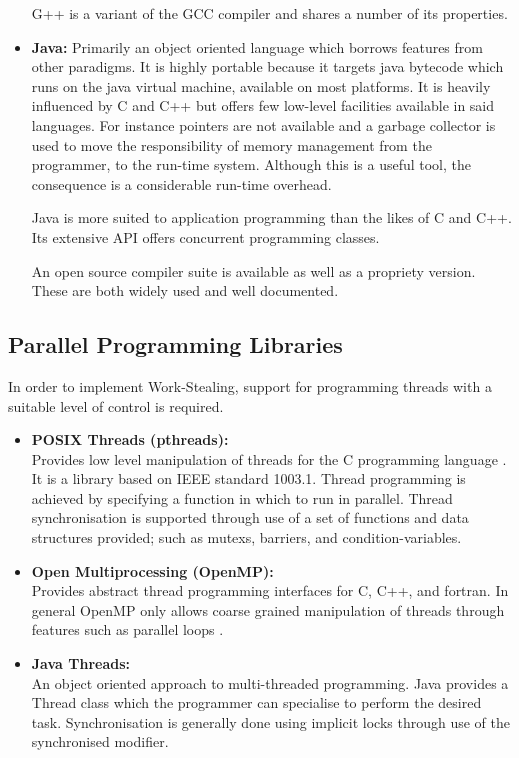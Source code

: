 \begin{itemize}
            G++ is a variant of the GCC compiler and shares a number of its properties.
            
\item \textbf{Java:}
            Primarily an object oriented language which borrows features from other paradigms.
            It is highly portable because it targets java bytecode which runs on the java virtual machine, available on most platforms.
            It is heavily influenced by C and C++ but offers few low-level facilities available in said languages. 
            For instance pointers are not available and a garbage collector is used to move
            the responsibility of memory management from the programmer, to the run-time system.
            Although this is a useful tool, the consequence is a considerable run-time overhead.
            
            Java is more suited to application programming than the likes of C and C++.
            Its extensive API offers concurrent programming classes.
            
            An open source compiler suite is available as well as a propriety version. 
            These are both widely used and well documented.
\end{itemize}

\subsection*{Parallel Programming Libraries}
In order to implement Work-Stealing, support for programming threads 
with a suitable level of control is required.

\begin{itemize}
\item \textbf{POSIX Threads (pthreads):} \\ 
              Provides low level manipulation of threads for the C programming language \cite{pthreadover}. 
              It is a library based on IEEE standard 1003.1. Thread programming is achieved by 
              specifying a function in which to run in parallel.
              Thread synchronisation is supported through use of a set of functions and data
              structures provided; such as \glspl{mutex}, \glspl{barrier}, and \glspl{condition-variable}. 
             
\item \textbf{Open Multiprocessing (OpenMP):} \\ 
              Provides abstract thread programming interfaces for C, C++, and fortran.
              In general OpenMP only allows coarse grained manipulation of threads through features such as parallel loops 
              \cite{ompvspthr}.

\item \textbf{Java Threads:} \\
              An object oriented approach to multi-threaded programming. Java provides a Thread class which
              the programmer can specialise to perform the desired task.
              Synchronisation is generally done using implicit locks through use of the synchronised modifier.
\end{itemize}


